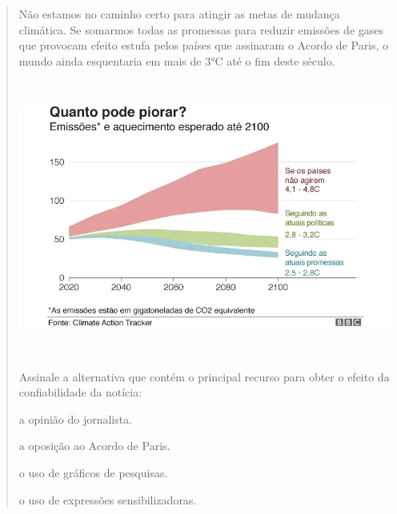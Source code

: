 \begin{quote}

Não estamos no caminho certo para atingir as metas de mudança
climática. Se somarmos todas as promessas para reduzir emissões de gases
que provocam efeito estufa pelos países que assinaram o Acordo de Paris,
o mundo ainda esquentaria em mais de 3°C até o fim deste século.

\includegraphics[width=5.90551in,height=3.56944in]{./imgSAEB_7_POR/media/image8.png}


Assinale a alternativa que contém o principal recurso para obter o efeito da 
confiabilidade da notícia:

\begin{escolha}

  \item a opinião do jornalista.
  
  \item a oposição ao Acordo de Paris.
  
  \item o uso de gráficos de pesquisas.
  
  \item o uso de expressões sensibilizadoras.

\end{escolha}

\end{quote}
